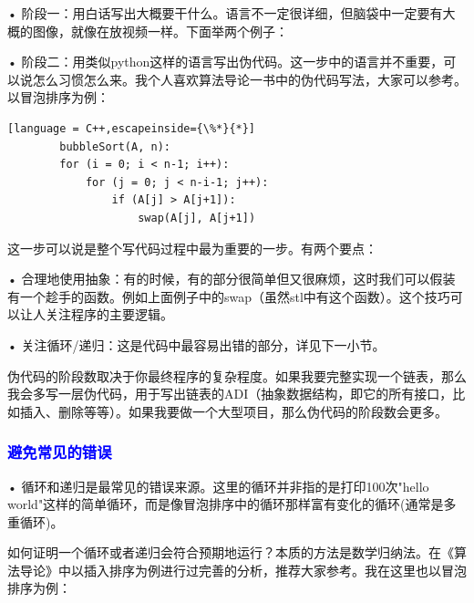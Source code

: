 \documentclass[UTF8]{ctexart}
\begin{document}
• 阶段一：用白话写出大概要干什么。语言不一定很详细，但脑袋中一定要有大概的图像，就像在放视频一样。下面举两个例子：


• 阶段二：用类似python这样的语言写出伪代码。这一步中的语言并不重要，可以说怎么习惯怎么来。我个人喜欢算法导论一书中的伪代码写法，大家可以参考。以冒泡排序为例：
\begin{lstlisting}[language = C++,escapeinside={\%*}{*}]
        bubbleSort(A, n):
        for (i = 0; i < n-1; i++):
            for (j = 0; j < n-i-1; j++):
                if (A[j] > A[j+1]):
                    swap(A[j], A[j+1])
\end{lstlisting}

这一步可以说是整个写代码过程中最为重要的一步。有两个要点：

• 合理地使用抽象：有的时候，有的部分很简单但又很麻烦，这时我们可以假装有一个趁手的函数。例如上面例子中的swap（虽然stl中有这个函数）。这个技巧可以让人关注程序的主要逻辑。

• 关注循环/递归：这是代码中最容易出错的部分，详见下一小节。

伪代码的阶段数取决于你最终程序的复杂程度。如果我要完整实现一个链表，那么我会多写一层伪代码，用于写出链表的ADI（抽象数据结构，即它的所有接口，比如插入、删除等等）。如果我要做一个大型项目，那么伪代码的阶段数会更多。

\subsubsection{\textcolor{blue}{避免常见的错误}}
• 循环和递归是最常见的错误来源。这里的循环并非指的是打印100次"hello world"这样的简单循环，而是像冒泡排序中的循环那样富有变化的循环(通常是多重循环)。

如何证明一个循环或者递归会符合预期地运行？本质的方法是数学归纳法。在《算法导论》中以插入排序为例进行过完善的分析，推荐大家参考。我在这里也以冒泡排序为例：
\end{document}
